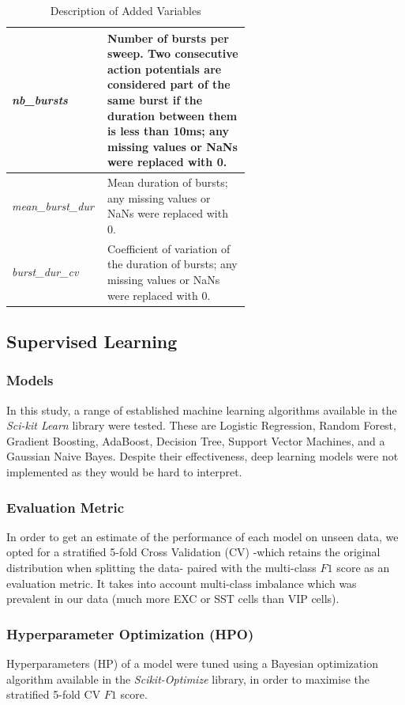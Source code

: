 \documentclass{IEEEtran}
\begin{document}
\begin{table}[h!]
\begin{tabular}{|l|p{0.6\linewidth}|}
  \hline
  \textit{nb\_bursts} & Number of bursts per sweep. Two consecutive action potentials are considered part of the same burst if the duration between them is less than 10ms; any missing values or NaNs were replaced with 0. \\
  \hline
  \textit{mean\_burst\_dur} & Mean duration of bursts; any missing values or NaNs were replaced with 0. \\
  \hline
  \textit{burst\_dur\_cv} & Coefficient of variation of the duration of bursts; any missing values or NaNs were replaced with 0. \\
  \hline
  \end{tabular}
  \caption{Description of Added Variables}
  \label{tab:variables}
\end{table}


\subsection{Supervised Learning}

\subsubsection{Models}
In this study, a range of established machine learning algorithms available in the \textit{Sci-kit Learn} library were tested. These are Logistic Regression, Random Forest, Gradient Boosting, AdaBoost, Decision Tree, Support Vector Machines, and a Gaussian Naive Bayes.
Despite their effectiveness, deep learning models were not implemented as they would be hard to interpret.

\subsubsection{Evaluation Metric}
In order to get an estimate of the performance of each model on unseen data, we opted for a stratified 5-fold Cross Validation (CV) -which retains the original distribution when splitting the data- paired with the multi-class $F1$ score as an evaluation metric. It takes into account multi-class imbalance which was prevalent in our data (much more EXC or SST cells than VIP cells).

\subsubsection{Hyperparameter Optimization (HPO)}
Hyperparameters (HP) of a model were tuned using a Bayesian optimization algorithm available in the \textit{Scikit-Optimize} library, in order to maximise the stratified 5-fold CV $F1$ score.
\end{document}
